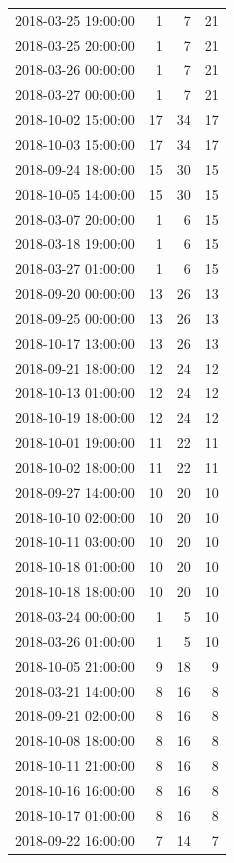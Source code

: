 \begin{tabular}{lrrr}
2018-03-25 19:00:00 & 1 & 7 & 21 \\
2018-03-25 20:00:00 & 1 & 7 & 21 \\
2018-03-26 00:00:00 & 1 & 7 & 21 \\
2018-03-27 00:00:00 & 1 & 7 & 21 \\
2018-10-02 15:00:00 & 17 & 34 & 17 \\
2018-10-03 15:00:00 & 17 & 34 & 17 \\
2018-09-24 18:00:00 & 15 & 30 & 15 \\
2018-10-05 14:00:00 & 15 & 30 & 15 \\
2018-03-07 20:00:00 & 1 & 6 & 15 \\
2018-03-18 19:00:00 & 1 & 6 & 15 \\
2018-03-27 01:00:00 & 1 & 6 & 15 \\
2018-09-20 00:00:00 & 13 & 26 & 13 \\
2018-09-25 00:00:00 & 13 & 26 & 13 \\
2018-10-17 13:00:00 & 13 & 26 & 13 \\
2018-09-21 18:00:00 & 12 & 24 & 12 \\
2018-10-13 01:00:00 & 12 & 24 & 12 \\
2018-10-19 18:00:00 & 12 & 24 & 12 \\
2018-10-01 19:00:00 & 11 & 22 & 11 \\
2018-10-02 18:00:00 & 11 & 22 & 11 \\
2018-09-27 14:00:00 & 10 & 20 & 10 \\
2018-10-10 02:00:00 & 10 & 20 & 10 \\
2018-10-11 03:00:00 & 10 & 20 & 10 \\
2018-10-18 01:00:00 & 10 & 20 & 10 \\
2018-10-18 18:00:00 & 10 & 20 & 10 \\
2018-03-24 00:00:00 & 1 & 5 & 10 \\
2018-03-26 01:00:00 & 1 & 5 & 10 \\
2018-10-05 21:00:00 & 9 & 18 & 9 \\
2018-03-21 14:00:00 & 8 & 16 & 8 \\
2018-09-21 02:00:00 & 8 & 16 & 8 \\
2018-10-08 18:00:00 & 8 & 16 & 8 \\
2018-10-11 21:00:00 & 8 & 16 & 8 \\
2018-10-16 16:00:00 & 8 & 16 & 8 \\
2018-10-17 01:00:00 & 8 & 16 & 8 \\
2018-09-22 16:00:00 & 7 & 14 & 7 \\

\end{tabular}

